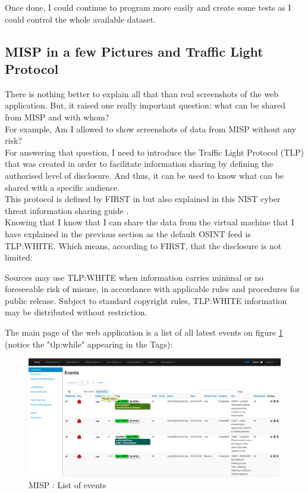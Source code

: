 \documentclass{eplmastersthesis}
\begin{document}
Once done, I could continue to program more easily and create some tests as I could control the whole available dataset.\\

\subsection{MISP in a few Pictures and Traffic Light Protocol}
There is nothing better to explain all that than real screenshots of the web application. But, it raised one really important question: what can be shared from MISP and with whom?\\
For example, Am I allowed to show screenshots of data from MISP without any risk?\\
For answering that question, I need to introduce the Traffic Light Protocol (TLP) that was created in order to facilitate information sharing by defining the authorised level of disclosure. And thus, it can be used to know what can be shared with a specific audience.\\
This protocol is defined by FIRST in \cite{FirstTLP} but also explained in this NIST cyber threat information sharing guide \cite{johnson2016guide}.\\

Knowing that I know that I can share the data from the virtual machine that I have explained in the previous section as the default OSINT feed is TLP:WHITE. Which means, according to FIRST, that the disclosure is not limited: \\

\begin{boxedverbatim}
	Sources may use TLP:WHITE when information carries minimal or no foreseeable 
	risk of misuse, in accordance with applicable rules and procedures for public 
	release. Subject to standard copyright rules, TLP:WHITE information may be 
	distributed without restriction.
\end{boxedverbatim}

The main page of the web application is a list of all latest events on figure \ref{webevents} (notice the "tlp:while" appearing in the Tags):

\begin{figure}[!h]
	\begin{center}
		\includegraphics[scale=0.32]{res/webEvents}
		\caption{MISP : List of events}
		\label{webevents}
	\end{center}
\end{figure}
\end{document}
